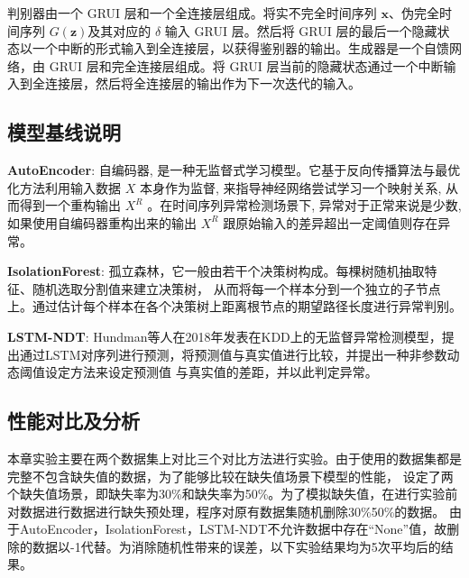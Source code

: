 判别器由一个 GRUI 层和一个全连接层组成。将实不完全时间序列 $\boldsymbol{x}$、伪完全时间序列 $G(\boldsymbol{z})$及其对应的 $\delta$ 输入 GRUI 层。然后将 GRUI 层的最后一个隐藏状态以一个中断的形式输入到全连接层，以获得鉴别器的输出。生成器是一个自馈网络，由 GRUI 层和完全连接层组成。将 GRUI 层当前的隐藏状态通过一个中断输入到全连接层，然后将全连接层的输出作为下一次迭代的输入。

\subsection{模型基线说明}
\textbf{AutoEncoder}: 自编码器\cite{none1}, 是一种无监督式学习模型。它基于反向传播算法与最优化方法利用输入数据 $X$ 本身作为监督, 来指导神经网络尝试学习一个映射关系, 
从而得到一个重构输出 $X^R$ 。在时间序列异常检测场景下, 异常对于正常来说是少数, 如果使用自编码器重构出来的输出 $X^R$ 跟原始输入的差异超出一定阈值则存在异常。

\textbf{IsolationForest}: 孤立森林\cite{none2}，它一般由若干个决策树构成。每棵树随机抽取特征、随机选取分割值来建立决策树，
从而将每一个样本分到一个独立的子节点上。通过估计每个样本在各个决策树上距离根节点的期望路径长度进行异常判别。

\textbf{LSTM-NDT}: Hundman等人\cite{lstm-ndt}在2018年发表在KDD上的无监督异常检测模型，提出通过LSTM对序列进行预测，将预测值与真实值进行比较，并提出一种非参数动态阈值设定方法来设定预测值
与真实值的差距，并以此判定异常。

\subsection{性能对比及分析}

本章实验主要在两个数据集上对比三个对比方法进行实验。由于使用的数据集都是完整不包含缺失值的数据，为了能够比较在缺失值场景下模型的性能，
设定了两个缺失值场景，即缺失率为30\%和缺失率为50\%。为了模拟缺失值，在进行实验前对数据进行数据进行缺失预处理，程序对原有数据集随机删除30\%50\%的数据。
由于AutoEncoder，IsolationForest，LSTM-NDT不允许数据中存在“None”值，故删除的数据以-1代替。为消除随机性带来的误差，以下实验结果均为5次平均后的结果。


